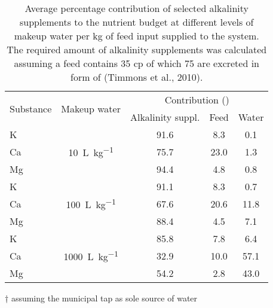 \begin{table}
\centering
  \begin{threeparttable}
  \caption{Average percentage contribution of selected alkalinity supplements to the nutrient budget at different levels of makeup water per \si{\kg} of feed input supplied to the system. The required amount of alkalinity supplements was calculated assuming a feed contains \SI{35}{\p} \gls{cp} of which \SI{75}{\p} are excreted in form of  (Timmons et al., 2010).}
  \label{tab:alkalinitycont}
    \begin{tabular}{lcccc}

    \toprule

    \multirow{2}{*}{Substance}
    & \multirow{2}{*}{Makeup water}
    & \multicolumn{3}{c}{Contribution (\si{\p})}
    \\

    \addlinespace
    \cline{3-5}
    \addlinespace

    &
    & Alkalinity suppl.
    & Feed
    & Water\tnote{†}
    \\

    \midrule

    K
    & \multirow{3}{*}{\SI{10}{\L\per\kg}}
    & 91.6
    & 8.3
    & 0.1
    \\

    Ca
    &
    & 75.7
    & 23.0
    & 1.3
    \\

    Mg
    &
    & 94.4
    & 4.8
    & 0.8
    \\

    \addlinespace

    K
    & \multirow{3}{*}{\SI{100}{\L\per\kg}}
    & 91.1
    & 8.3
    & 0.7
    \\

    Ca
    &
    & 67.6
    & 20.6
    & 11.8
    \\

    Mg
    &
    & 88.4
    & 4.5
    & 7.1
    \\

    \addlinespace

    K
    & \multirow{3}{*}{\SI{1000}{\L\per\kg}}
    & 85.8
    & 7.8
    & 6.4
    \\

    Ca
    &
    & 32.9
    & 10.0
    & 57.1
    \\

    Mg
    &
    & 54.2
    & 2.8
    & 43.0
    \\

  \bottomrule
  \end{tabular}
    \begin{tablenotes}
      \item[†] assuming the municipal tap as sole source of water
    \end{tablenotes}
  \end{threeparttable}
\end{table}
